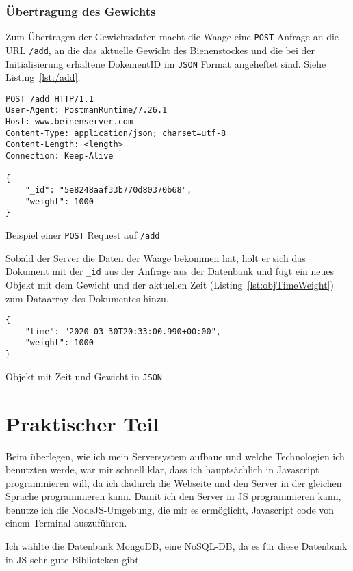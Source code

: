 \documentclass[a4paper, ngerman, 11pt]{scrartcl}
\begin{document}
\subsubsection{Übertragung des Gewichts}
Zum Übertragen der Gewichtsdaten macht die Waage eine \texttt{POST} Anfrage an die URL \texttt{/add}, an die das aktuelle Gewicht des Bienenstockes und die bei der Initialisierung erhaltene DokementID im \texttt{JSON} Format angeheftet sind. Siehe Listing~\ref{lst:/add}.
\begin{listing}[ht]
\centering
\begin{verbatim}
POST /add HTTP/1.1
User-Agent: PostmanRuntime/7.26.1
Host: www.beinenserver.com
Content-Type: application/json; charset=utf-8
Content-Length: <length>
Connection: Keep-Alive

{
    "_id": "5e8248aaf33b770d80370b68",
    "weight": 1000
}
\end{verbatim}
\caption{Beispiel einer \texttt{POST} Request auf \texttt{/add}}\label{lst:/add}
\end{listing}

Sobald der Server die Daten der Waage bekommen hat, holt er sich das Dokument mit der \texttt{\_id} aus der Anfrage aus der Datenbank und fügt ein neues Objekt mit dem Gewicht und der aktuellen Zeit (Listing~\ref{lst:objTimeWeight}) zum Dataarray des Dokumentes hinzu.
\begin{listing}[ht]
\centering
\begin{verbatim}
{
    "time": "2020-03-30T20:33:00.990+00:00",
    "weight": 1000
}
\end{verbatim}
\caption{Objekt mit Zeit und Gewicht in \texttt{JSON}\label{lst:objTimeWeight}}
\end{listing}

\section{Praktischer Teil}

Beim überlegen, wie ich mein Serversystem aufbaue und welche Technologien ich benutzten werde, war mir schnell klar, dass ich hauptsächlich in Javascript programmieren will, da ich dadurch die Webseite und den Server in der gleichen Sprache programmieren kann.
Damit ich den Server in JS programmieren kann, benutze ich die NodeJS-Umgebung, die mir es ermöglicht, Javascript code von einem Terminal auszuführen.

Ich wählte die Datenbank MongoDB, eine NoSQL-DB, da es für diese Datenbank in JS sehr gute Biblioteken gibt.
\end{document}
